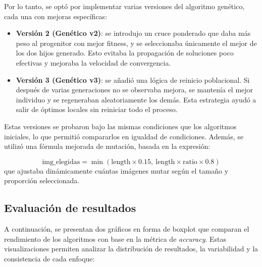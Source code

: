 Por lo tanto, se optó por implementar varias versiones del algoritmo genético, cada una con mejoras específicas:


\begin{itemize}
    \item \textbf{Versión 2 (Genético v2)}: se introdujo un cruce ponderado que daba más peso al progenitor con mejor fitness,
          y se seleccionaba únicamente el mejor de los dos hijos generado.
          Esto evitaba la propagación de soluciones poco efectivas y mejoraba la velocidad de convergencia.
    \item \textbf{Versión 3 (Genético v3)}: se añadió una lógica de reinicio poblacional. Si después de varias generaciones
          no se observaba mejora, se mantenía el mejor individuo y se regeneraban aleatoriamente los demás.
          Esta estrategia ayudó a salir de óptimos locales sin reiniciar todo el proceso.
\end{itemize}

Estas versiones se probaron bajo las mismas condiciones que los algoritmos iniciales, lo que permitió compararlos en igualdad de condiciones.
Además, se utilizó una fórmula mejorada de mutación, basada en la expresión:


\[
    \mathrm{img\_elegidas} = \min\left(\mathrm{length} \times 0.15,\ \mathrm{length} \times \mathrm{ratio} \times 0.8\right)
\]
que ajustaba dinámicamente cuántas imágenes mutar según el tamaño y proporción seleccionada.


\subsection{Evaluación de resultados}\label{sec:evaluacion-de-resultados}
A continuación, se presentan dos gráficos en forma de boxplot que comparan el rendimiento de los algoritmos con base en la métrica de \textit{accuracy}.
Estas visualizaciones permiten analizar la distribución de resultados, la variabilidad y la consistencia de cada enfoque:

